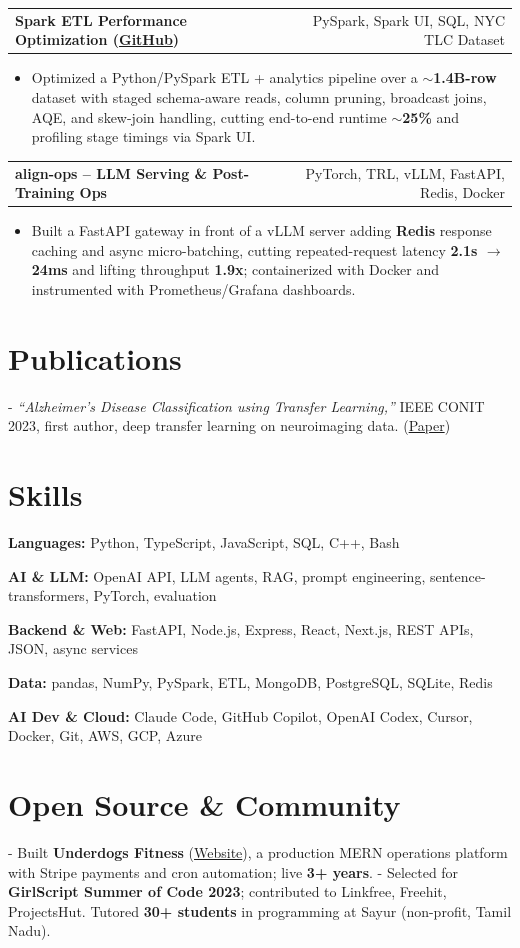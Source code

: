 \documentclass[letterpaper,11pt]{article}
\makeatletter
\newcommand{\projItem}[2]{%
  \vspace{2pt}
  \begin{tabular*}{\textwidth}{@{}l@{\extracolsep{\fill}}r@{}}
    \textbf{#1} & #2 \\
  \end{tabular*}\par\vspace{-3pt}
}
\newcommand{\skillLine}[2]{\textbf{#1:} #2\par\vspace{1.5pt}}
\newcommand{\inlineBlock}[1]{{\setlength{\leftskip}{0.18in}\small #1\par}}
\makeatother
\begin{document}
\projItem{Spark ETL Performance Optimization {\normalfont\small(\href{https://github.com/Deva-1903/Spark-ETL-Optimization}{GitHub})}}{PySpark, Spark UI, SQL, NYC TLC Dataset}
\begin{itemize}
  \item Optimized a Python/PySpark ETL + analytics pipeline over a \textbf{$\sim$1.4B-row} dataset with staged schema-aware reads, column pruning, broadcast joins, AQE, and skew-join handling, cutting end-to-end runtime \textbf{$\sim$25\%} and profiling stage timings via Spark UI.
\end{itemize}

\projItem{align-ops -- LLM Serving \& Post-Training Ops}{PyTorch, TRL, vLLM, FastAPI, Redis, Docker}
\begin{itemize}
  \item Built a FastAPI gateway in front of a vLLM server adding \textbf{Redis} response caching and async micro-batching, cutting repeated-request latency \textbf{2.1s $\to$ 24ms} and lifting throughput \textbf{1.9x}; containerized with Docker and instrumented with Prometheus/Grafana dashboards.
\end{itemize}

\section{Publications}
\vspace{2pt}
\inlineBlock{- \textit{``Alzheimer's Disease Classification using Transfer Learning,''} IEEE CONIT 2023, first author, deep transfer learning on neuroimaging data. {\normalfont\small(\href{https://ieeexplore.ieee.org/document/10205760}{Paper})}}

\section{Skills}
\skillLine{Languages}{Python, TypeScript, JavaScript, SQL, C++, Bash}
\skillLine{AI \& LLM}{OpenAI API, LLM agents, RAG, prompt engineering, sentence-transformers, PyTorch, evaluation}
\skillLine{Backend \& Web}{FastAPI, Node.js, Express, React, Next.js, REST APIs, JSON, async services}
\skillLine{Data}{pandas, NumPy, PySpark, ETL, MongoDB, PostgreSQL, SQLite, Redis}
\skillLine{AI Dev \& Cloud}{Claude Code, GitHub Copilot, OpenAI Codex, Cursor, Docker, Git, AWS, GCP, Azure}

\section{Open Source \& Community}
\inlineBlock{- Built \textbf{Underdogs Fitness} (\href{https://www.underdogsfitness.in/}{Website}), a production MERN operations platform with Stripe payments and cron automation; live \textbf{3+ years}. - Selected for \textbf{GirlScript Summer of Code 2023}; contributed to Linkfree, Freehit, ProjectsHut. Tutored \textbf{30+ students} in programming at Sayur (non-profit, Tamil Nadu).}
\end{document}
